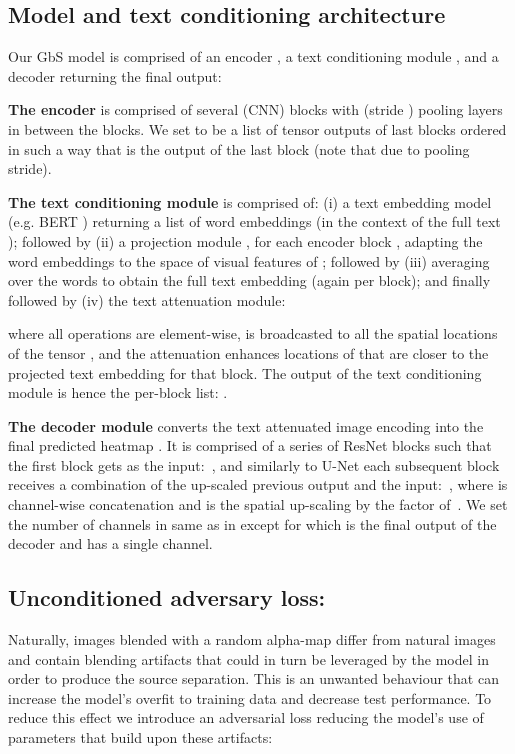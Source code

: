\documentclass[10pt,twocolumn,letterpaper]{article}
\def\oursspace{{GbS }}
\newcommand\secvspace{\vspace{-0.0cm}}
\begin{document}
\secvspace
\subsection{Model and text conditioning architecture}\label{sec:arch}
\secvspace
Our \oursspace model  is comprised of an encoder , a text conditioning module , and a decoder  returning the final output:


\noindent\textbf{The encoder}  is comprised of several (CNN) blocks with (stride ) pooling layers in between the blocks. We set  to be a list of tensor outputs of  last blocks ordered in such a way that  is the output of the last block (note that  due to pooling stride). 

\noindent\textbf{The text conditioning module}  is comprised of: (i) a text embedding model (e.g. 
BERT \cite{devlin2018bert})  returning a list of word embeddings (in the context of the full text ); followed by (ii) a projection module , for each encoder  block , adapting the word embeddings to the space of visual features of ; followed by (iii) averaging over the words  to obtain the full text  embedding (again per block); and finally followed by (iv) the text attenuation module: 

where all operations are element-wise,  is broadcasted to all the spatial locations of the tensor , and the attenuation enhances locations of  that are closer to the projected text embedding for that block. The output of the text conditioning module is hence the per-block list: .

\noindent\textbf{The decoder module}   converts the text attenuated image encoding  into the final predicted heatmap . It is comprised of a series of ResNet \cite{he2016deep} blocks  such that the first block  gets  as the input:~, and similarly to U-Net \cite{ronneberger2015unet} each subsequent block receives a combination of the up-scaled previous output and the input:~, where  is channel-wise concatenation and  is the spatial up-scaling by the factor of~. We set the number of channels in  same as in  except for  which is the final output of the decoder  and has a single channel.

\secvspace
\subsection{Unconditioned adversary loss: }\label{sec:adv}
\secvspace
Naturally, images blended with a random alpha-map  differ from natural images and contain blending artifacts that could in turn be leveraged by the model  in order to produce the source separation. This is an unwanted behaviour that can increase the model's overfit to training data and decrease test performance. To reduce this effect we introduce an adversarial loss reducing the model's use of parameters that build upon these artifacts:
\end{document}
